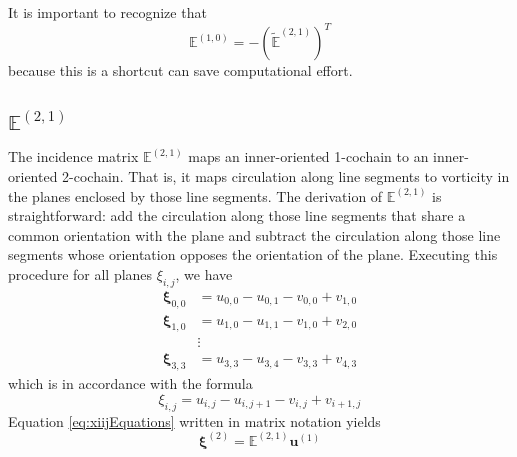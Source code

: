 It is important to recognize that
\begin{equation}
    \mathbb{E}^{(1,0)} = -\left(\tilde{\mathbb{E}}^{(2,1)}\right)^T
\end{equation}
because this is a shortcut can save computational effort.

\subsection{$\mathbb{E}^{(2,1)}$}

The incidence matrix $\mathbb{E}^{(2,1)}$ maps an inner-oriented 1-cochain to an inner-oriented 2-cochain. That is, it maps circulation along line segments to vorticity in the planes enclosed by those line segments. The derivation of $\mathbb{E}^{(2,1)}$ is straightforward: add the circulation along those line segments that share a common orientation with the plane and subtract the circulation along those line segments whose orientation opposes the orientation of the plane. Executing this procedure for all planes $\xi_{i,j}$, we have
\begin{equation}
    \begin{split}
        \mathbf{\xi}_{0,0} &= u_{0,0} - u_{0,1} - v_{0,0} + v_{1,0} \\
        \mathbf{\xi}_{1,0} &= u_{1,0} - u_{1,1} - v_{1,0} + v_{2,0} \\
        &\vdots \\
        \mathbf{\xi}_{3,3} &= u_{3,3} - u_{3,4} - v_{3,3} + v_{4,3}
    \end{split}
    \label{eq:xiijEquations}
\end{equation}
which is in accordance with the formula
\begin{equation}
    \xi_{i,j} = u_{i,j} - u_{i,j+1} - v_{i,j} + v_{i+1,j}
\end{equation}
Equation \eqref{eq:xiijEquations} written in matrix notation yields
\begin{equation}
    \mathbf{\xi}^{(2)} = \mathbb{E}^{(2,1)} \mathbf{u}^{(1)}
\end{equation}


